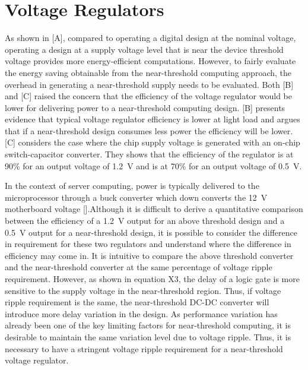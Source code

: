 \section{Voltage Regulators}
\label{sec:regulators}

As shown in [A], compared to operating a digital design at the nominal voltage,
operating a design at a supply voltage level that is near the device threshold
voltage provides more energy-efficient computations. However, to fairly evaluate
the energy saving obtainable from the near-threshold computing approach, the
overhead in generating a near-threshold supply needs to be evaluated. Both [B]
and [C] raised the concern that the efficiency of the voltage regulator would be
lower for delivering power to a near-threshold computing design. [B] presents
evidence that typical voltage regulator efficiency is lower at light load and
argues that if a near-threshold design consumes less power the efficiency will
be lower.  [C] considers the case where the chip supply voltage is generated
with an on-chip switch-capacitor converter. They shows that the efficiency of
the regulator is at 90\% for an output voltage of \SI{1.2}{\volt} and is at 70\%
for an output voltage of \SI{0.5}{\volt}.

In the context of server computing, power is typically delivered to the
microprocessor through a buck converter which down converts the \SI{12}{\volt}
motherboard voltage [].Although it is difficult to derive a quantitative
comparison between the efficiency of a \SI{1.2}{\volt} output for an above
threshold design and a \SI{0.5}{\volt} output for a near-threshold design, it is
possible to consider the difference in requirement for these two regulators and
understand where the difference in efficiency may come in. It is intuitive to
compare the above threshold converter and the near-threshold converter at the
same percentage of voltage ripple requirement. However, as shown in equation X3,
the delay of a logic gate is more sensitive to the supply voltage in the
near-threshold region.  Thus, if voltage ripple requirement is the same, the
near-threshold DC-DC converter will introduce more delay variation in the
design. As performance variation has already been one of the key limiting
factors for near-threshold computing, it is desirable to maintain the same
variation level due to voltage ripple. Thus, it is necessary to have a stringent
voltage ripple requirement for a near-threshold voltage regulator. 

